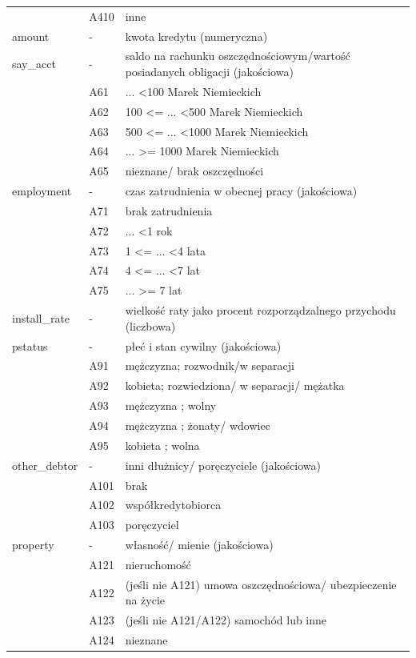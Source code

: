 \documentclass[polish, twoside, 12pt, a4paper]{article}
\theoremstyle{definition}
\theoremstyle{plain}
\theoremstyle{remark}
\begin{document}
\begin{landscape}
{\begin{longtable}{lll}
 & A410 & inne\\  
amount & - & kwota kredytu (numeryczna)\\  
say\_acct & - & saldo na rachunku oszczędnościowym/wartość posiadanych obligacji (jakościowa)\\  
 & A61 & ... \textless100 Marek Niemieckich\\  
 & A62 & 100 \textless= ... \textless 500 Marek Niemieckich\\  
 & A63 & 500 \textless= ... \textless 1000 Marek Niemieckich\\  
 & A64 & ... \textgreater= 1000 Marek Niemieckich\\  
 & A65 & nieznane/ brak oszczędności\\  
employment & - & czas zatrudnienia w obecnej pracy (jakościowa)\\  
 & A71 & brak zatrudnienia\\  
 & A72 & ... \textless 1 rok\\  
 & A73 & 1 \textless= ... \textless 4 lata\\  
 & A74 & 4 \textless= ... \textless 7 lat\\  
 & A75 & ... \textgreater= 7 lat\\  
install\_rate & - & wielkość raty jako procent rozporządzalnego przychodu (liczbowa)\\  
pstatus & - & płeć i stan cywilny (jakościowa)\\  
 & A91 & mężczyzna; rozwodnik/w separacji\\  
 & A92 & kobieta; rozwiedziona/ w separacji/ mężatka\\  
 & A93 & mężczyzna ; wolny\\  
 & A94 & mężczyzna ; żonaty/ wdowiec\\  
 & A95 & kobieta ; wolna\\  
other\_debtor & - & inni dłużnicy/ poręczyciele (jakościowa)\\  
 & A101 & brak\\  
 & A102 & współkredytobiorca\\  
 & A103 & poręczyciel\\  
property & - & własność/ mienie (jakościowa)\\  
 & A121 & nieruchomość\\  
 & A122 & (jeśli nie A121) umowa oszczędnościowa/ ubezpieczenie na życie\\  
 & A123 & (jeśli nie A121/A122) samochód lub inne\\  
 & A124 & nieznane\\  

\end{longtable}}
\end{landscape}
\end{document}
